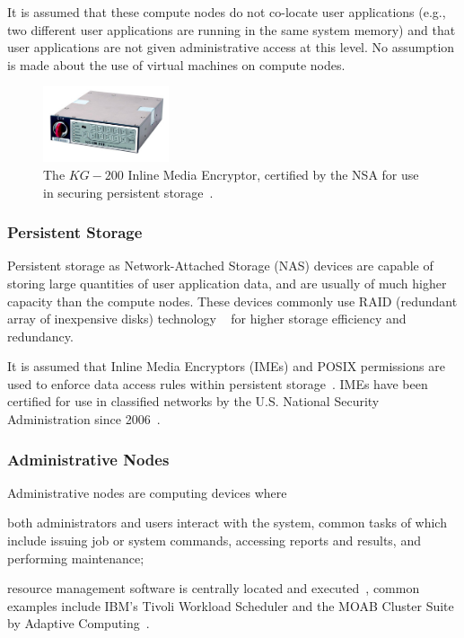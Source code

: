 \documentclass[oneside,12pt]{memoir}
\begin{document}
It is assumed that these compute nodes do not co-locate user applications (e.g., two different user applications are running in the same system memory) and that user applications are not given administrative access at this level. No assumption is made about the use of virtual machines on compute nodes.

\begin{figure}
  \begin{center}
    \includegraphics[width=0.33\textwidth]{inline_media_encryptor.jpg}
  \end{center}
  \caption{The $KG-200$ Inline Media Encryptor, certified by the NSA for use in securing persistent storage~\cite{nsa_ime_website}.}
\label{fig:inline_media_encryptor}
\end{figure}

\subsubsection{Persistent Storage}
Persistent storage as Network-Attached Storage (NAS) devices are capable of storing large quantities of user application data, and are usually of much higher capacity than the compute nodes.  These devices commonly use RAID (redundant array of inexpensive disks) technology ~\cite{katz1989disk} for higher storage efficiency and redundancy. 

It is assumed that Inline Media Encryptors (IMEs) and POSIX permissions are used to enforce data access rules within persistent storage~\cite{nsa_ime}. IMEs have been certified for use in classified networks by the U.S. National Security Administration since 2006~\cite{nsa_ime_website}. 

\subsubsection{Administrative Nodes}
Administrative nodes are computing devices where \begin{inparaenum}
\item both administrators and users interact with the system, common tasks of which include issuing job or system commands, accessing reports and results, and performing maintenance;
\item resource management software is centrally located and executed~\cite{keller2001anatomy}, common examples include IBM's Tivoli Workload Scheduler and the MOAB Cluster Suite by Adaptive Computing~\cite{arackal2009access}\cite{jackson2006demand}.
\end{inparaenum}
\end{document}

